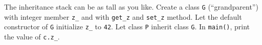 The inheritance stack can be as tall as you like. Create a class \verb!G! (``grandparent'') with integer member \verb!z_! and with \verb!get_z! and \verb!set_z! method. Let the default constructor of \verb!G! initialize \verb!z_! to \verb!42!. Let class \verb!P! inherit class \verb!G!. In \verb!main()!, print the value of \verb!c.z_!.

